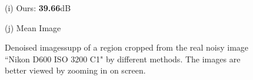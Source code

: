 \documentclass[10pt,onecolumn,letterpaper]{article}
\begin{document}
\begin{figure}[H]
{\begin{minipage}[t]{0.196\textwidth}
{\footnotesize (i) Ours: \textbf{39.66}dB  }
\end{minipage}
\begin{minipage}[t]{0.196\textwidth}
\centering
{}
{\footnotesize (j) Mean Image \cite{crosschannel2016} }
\end{minipage}
}
\caption{Denoised imagessupp of a region cropped from the real noisy image ``Nikon D600 ISO 3200 C1" \cite{crosschannel2016} by different methods. The images are better viewed by zooming in on screen.} 
\label{fig13}
\end{figure}
\end{document}
